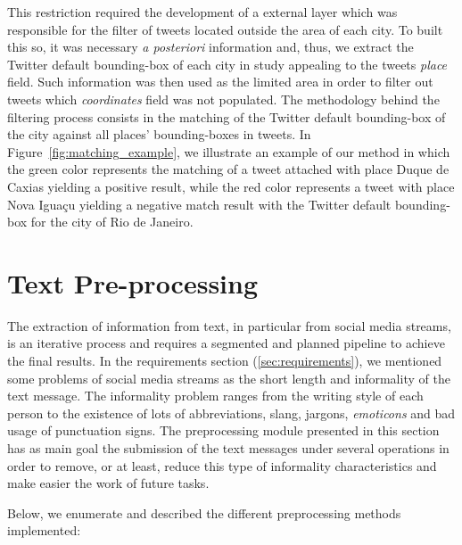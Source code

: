 This restriction required the development of a external layer which was responsible for the filter of tweets located outside the area of each city. To built this so, it was necessary \textit{a posteriori} information and, thus, we extract the Twitter default bounding-box of each city in study appealing to the tweets \textit{place} field. Such information was then used as the limited area in order to filter out tweets which \textit{coordinates} field was not populated. The methodology behind the filtering process consists in the matching of the Twitter default bounding-box of the city against all places' bounding-boxes in tweets. In Figure~\ref{fig:matching_example}, we illustrate an example of our method in which the green color represents the matching of a tweet attached with place Duque de Caxias yielding a positive result, while the red color represents a tweet with place Nova Iguaçu yielding a negative match result with the Twitter default bounding-box for the city of Rio de Janeiro.

\section{Text Pre-processing}\label{sec:text_preprocessing}
The extraction of information from text, in particular from social media streams, is an iterative process and requires a segmented and planned pipeline to achieve the final results. In the requirements section (\ref{sec:requirements}), we mentioned some problems of social media streams as the short length and informality of the text message. The informality problem ranges from the writing style of each person to the existence of lots of abbreviations, slang, jargons, \textit{emoticons} and bad usage of punctuation signs. The preprocessing module presented in this section has as main goal the submission of the text messages under several operations in order to remove, or at least, reduce this type of informality characteristics and make easier the work of future tasks.

Below, we enumerate and described the different preprocessing methods implemented:

